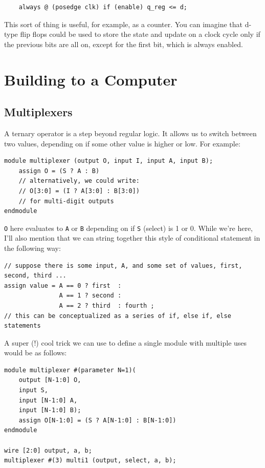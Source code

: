 \bs 
\begin{lstlisting}
    always @ (posedge clk) if (enable) q_reg <= d;
\end{lstlisting}
\bs

This sort of thing is useful, for example, as a counter. You can imagine that d-type flip flops could be used to store the state and update on a clock cycle only if the previous bits are all on, except for the first bit, which is always enabled. 


\section{Building to a Computer}

\subsection{Multiplexers}

A ternary operator is a step beyond regular logic. It allows us to switch between two values, depending on if some other value is higher or low. For example:

\bs 
\begin{lstlisting}
module multiplexer (output O, input I, input A, input B); 
    assign O = (S ? A : B)
    // alternatively, we could write: 
    // O[3:0] = (I ? A[3:0] : B[3:0])
    // for multi-digit outputs
endmodule
\end{lstlisting}
\bs

\texttt{O} here evaluates to \texttt{A} or \texttt{B} depending on if \texttt{S} (select) is 1 or 0. While we're here, I'll also mention that we can string together this style of conditional statement in the following way: 

\bs 
\begin{lstlisting}
// suppose there is some input, A, and some set of values, first, second, third ...
assign value = A == 0 ? first  : 
               A == 1 ? second :
               A == 2 ? third  : fourth ; 
// this can be conceptualized as a series of if, else if, else statements 
\end{lstlisting}
\bs

A super (!) cool trick we can use to define a single module with multiple uses would be as follows: 

\bs 
\begin{lstlisting}
module multiplexer #(parameter N=1)(
    output [N-1:0] O, 
    input S, 
    input [N-1:0] A, 
    input [N-1:0] B);
    assign O[N-1:0] = (S ? A[N-1:0] : B[N-1:0])
endmodule

wire [2:0] output, a, b; 
multiplexer #(3) multi1 (output, select, a, b); 
\end{lstlisting}
\bs

